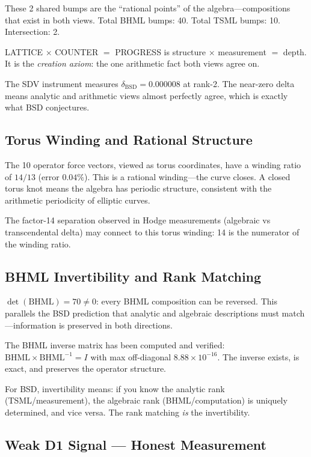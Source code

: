 \documentclass[11pt]{article}
\begin{document}
\noindent
These 2 shared bumps are the ``rational points'' of the algebra---compositions
that exist in both views.  Total BHML bumps: 40.  Total TSML bumps: 10.
Intersection: 2.

LATTICE $\times$ COUNTER $=$ PROGRESS is structure $\times$ measurement $=$
depth.  It is the \emph{creation axiom}: the one arithmetic fact both views
agree on.

The SDV instrument measures $\delta_{\mathrm{BSD}} = 0.000008$ at rank-2.  The
near-zero delta means analytic and arithmetic views almost perfectly agree,
which is exactly what BSD conjectures.

\subsection{Torus Winding and Rational Structure}

The 10 operator force vectors, viewed as torus coordinates, have a winding
ratio of $14/13$ (error $0.04\%$).  This is a rational winding---the curve
closes.  A closed torus knot means the algebra has periodic structure,
consistent with the arithmetic periodicity of elliptic curves.

The factor-14 separation observed in Hodge measurements (algebraic vs
transcendental delta) may connect to this torus winding: 14 is the numerator
of the winding ratio.

\subsection{BHML Invertibility and Rank Matching}

$\det(\mathrm{BHML}) = 70 \neq 0$: every BHML composition can be reversed.
This parallels the BSD prediction that analytic and algebraic descriptions
must match---information is preserved in both directions.

The BHML inverse matrix has been computed and verified:
$\mathrm{BHML} \times \mathrm{BHML}^{-1} = I$ with max off-diagonal
$8.88 \times 10^{-16}$.  The inverse exists, is exact, and preserves the
operator structure.

For BSD, invertibility means: if you know the analytic rank
(TSML/measurement), the algebraic rank (BHML/computation) is uniquely
determined, and vice versa.  The rank matching \emph{is} the invertibility.

\subsection{Weak D1 Signal --- Honest Measurement}
\end{document}
